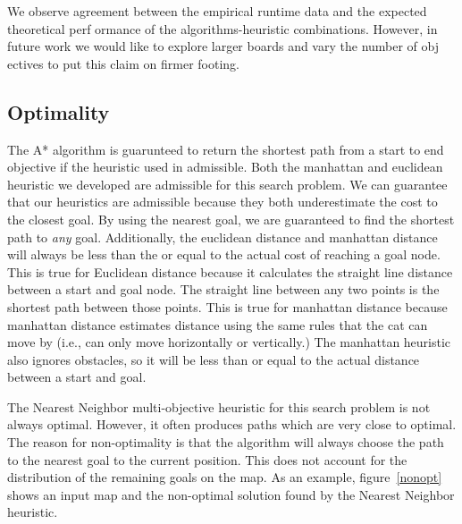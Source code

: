 \documentclass[12pt, conference, compsocconf]{IEEEtran}
\begin{document}
We observe agreement between the empirical runtime data and the expected theoretical perf
ormance of the algorithms-heuristic combinations.
However, in future work we would like to explore larger boards and vary the number of obj
ectives to put this claim on firmer footing.


\subsection{Optimality}
The A* algorithm is guarunteed to return the shortest path from a start to end
objective if the heuristic used in admissible.  Both the manhattan and
euclidean heuristic we developed are admissible for this search problem.  We
can guarantee that our heuristics are admissible because they both
underestimate the cost to the closest goal.  By using the nearest goal, we are
guaranteed to find the shortest path to {\em any} goal.  Additionally, the
euclidean distance and manhattan distance will always be less than the or equal
to the actual cost of reaching a goal node.  This is true for Euclidean
distance because it calculates the straight line distance between a start and
goal node.  The straight line between any two points is the shortest path
between those points.  This is true for manhattan distance because manhattan
distance estimates distance using the same rules that the cat can move by
(i.e., can only move horizontally or vertically.)  The manhattan heuristic also
ignores obstacles, so it will be less than or equal to the actual distance
between a start and goal.

The Nearest Neighbor multi-objective heuristic for this search problem is not
always optimal.  However, it often produces paths which are very close to
optimal.  The reason for non-optimality is that the algorithm will always
choose the path to the nearest goal to the current position.  This does not
account for the distribution of the remaining goals on the map.  As an example,
figure~\ref{nonopt} shows an input map and the non-optimal solution found by
the Nearest Neighbor heuristic.
\end{document}
